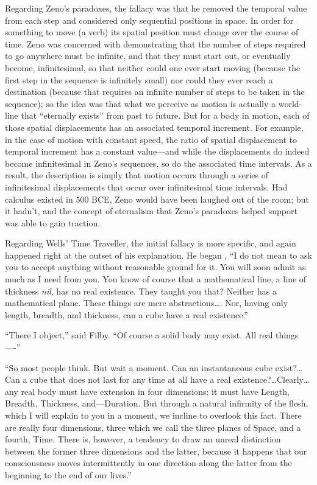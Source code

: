 \documentclass[aps,rmp,groupedaddress,twocolumn,10pt]{revtex4-2}
\begin{document}
Regarding Zeno's paradoxes, the fallacy was that he removed the temporal value from each step and considered only sequential positions in space. In order for something to move (a verb) its spatial position must change over the course of time. Zeno was concerned with demonstrating that the number of steps required to go anywhere must be infinite, and that they must start out, or eventually become, infinitesimal, so that neither could one ever start moving (because the first step in the sequence is infinitely small) nor could they ever reach a destination (because that requires an infinite number of steps to be taken in the sequence); so the idea was that what we perceive as motion is actually a world-line that ``eternally exists'' from past to future. But for a body in motion, each of those spatial displacements has an associated temporal increment. For example, in the case of motion with constant speed, the ratio of spatial displacement to temporal increment has a constant value---and while the displacements do indeed become infinitesimal in Zeno's sequences, so do the associated time intervals. As a result, the description is simply that motion occurs through a series of infinitesimal displacements that occur over infinitesimal time intervals. Had calculus existed in 500 BCE, Zeno would have been laughed out of the room; but it hadn't, and the concept of eternalism that Zeno's paradoxes helped support was able to gain traction.

Regarding Wells' Time Traveller, the initial fallacy is more specific, and again happened right at the outset of his explanation. He began \cite{Wells1895}, ``I do not mean to ask you to accept anything without reasonable ground for it. You will soon admit as much as I need from you. You know of course that a mathematical line, a line of thickness \textit{nil}, has no real existence. They taught you that? Neither has a mathematical plane. These things are mere abstractions\ldots. Nor, having only length, breadth, and thickness, can a cube have a real existence.''

``There I object,'' said Filby. ``Of course a solid body may exist. All real things----''

``So most people think. But wait a moment. Can an instantaneous cube exist?\ldots Can a cube that does not last for any time at all have a real existence?\ldots Clearly\ldots any real body must have extension in four dimensions: it must have Length, Breadth, Thickness, and---Duration. But through a natural infirmity of the flesh, which I will explain to you in a moment, we incline to overlook this fact. There are really four dimensions, three which we call the three planes of Space, and a fourth, Time. There is, however, a tendency to draw an unreal distinction between the former three dimensions and the latter, because it happens that our consciousness moves intermittently in one direction along the latter from the beginning to the end of our lives.''
\end{document}

